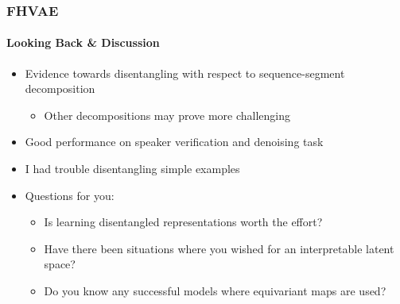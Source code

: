 \documentclass[9pt]{beamer}
\begin{document}
\begin{frame}
\frametitle{FHVAE}
\framesubtitle{Looking Back \& Discussion} %
\begin{itemize}
	\item Evidence towards disentangling with respect to sequence-segment decomposition
	\begin{itemize}
		\item Other decompositions may prove more challenging
	\end{itemize}
	\item Good performance on speaker verification and denoising task
	\item I had trouble disentangling simple examples
	\item Questions for you:
	\begin{itemize}
		\item Is learning disentangled representations worth the effort?
		\item Have there been situations where you wished for an interpretable latent space?
		\item Do you know any successful models where equivariant maps are used?
	\end{itemize}
\end{itemize}
\end{frame} 
\end{document}
